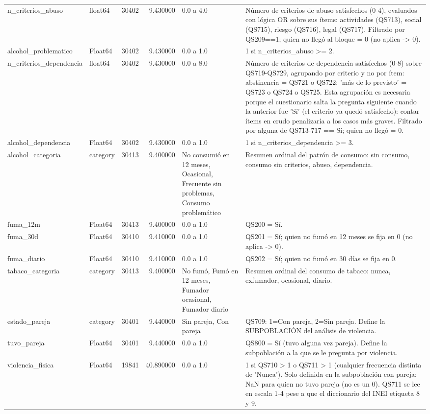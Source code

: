 \begin{longtable}{llrrll}
n\_criterios\_abuso & float64 & 30402 & 9.430000 & 0.0 a 4.0 & Número de criterios de abuso satisfechos (0-4), evaluados con lógica OR sobre sus ítems: actividades (QS713), social (QS715), riesgo (QS716), legal (QS717). Filtrado por QS209==1; quien no llegó al bloque = 0 (no aplica -> 0). \\
alcohol\_problematico & Float64 & 30402 & 9.430000 & 0.0 a 1.0 & 1 si n\_criterios\_abuso >= 2. \\
n\_criterios\_dependencia & float64 & 30402 & 9.430000 & 0.0 a 8.0 & Número de criterios de dependencia satisfechos (0-8) sobre QS719-QS729, agrupando por criterio y no por ítem: abstinencia = QS721 o QS722; 'más de lo previsto' = QS723 o QS724 o QS725. Esta agrupación es necesaria porque el cuestionario salta la pregunta siguiente cuando la anterior fue 'Sí' (el criterio ya quedó satisfecho): contar ítems en crudo penalizaría a los casos más graves. Filtrado por alguna de QS713-717 == Sí; quien no llegó = 0. \\
alcohol\_dependencia & Float64 & 30402 & 9.430000 & 0.0 a 1.0 & 1 si n\_criterios\_dependencia >= 3. \\
alcohol\_categoria & category & 30413 & 9.400000 & No consumió en 12 meses, Ocasional, Frecuente sin problemas, Consumo problemático & Resumen ordinal del patrón de consumo: sin consumo, consumo sin criterios, abuso, dependencia. \\
fuma\_12m & Float64 & 30413 & 9.400000 & 0.0 a 1.0 & QS200 = Sí. \\
fuma\_30d & Float64 & 30410 & 9.410000 & 0.0 a 1.0 & QS201 = Sí; quien no fumó en 12 meses se fija en 0 (no aplica -> 0). \\
fuma\_diario & Float64 & 30410 & 9.410000 & 0.0 a 1.0 & QS202 = Sí; quien no fumó en 30 días se fija en 0. \\
tabaco\_categoria & category & 30413 & 9.400000 & No fumó, Fumó en 12 meses, Fumador ocasional, Fumador diario & Resumen ordinal del consumo de tabaco: nunca, exfumador, ocasional, diario. \\
estado\_pareja & category & 30401 & 9.440000 & Sin pareja, Con pareja & QS709: 1=Con pareja, 2=Sin pareja. Define la SUBPOBLACIÓN del análisis de violencia. \\
tuvo\_pareja & Float64 & 30401 & 9.440000 & 0.0 a 1.0 & QS800 = Sí (tuvo alguna vez pareja). Define la subpoblación a la que se le pregunta por violencia. \\
violencia\_fisica & Float64 & 19841 & 40.890000 & 0.0 a 1.0 & 1 si QS710 > 1 o QS711 > 1 (cualquier frecuencia distinta de 'Nunca'). Solo definida en la subpoblación con pareja; NaN para quien no tuvo pareja (no es un 0). QS711 se lee en escala 1-4 pese a que el diccionario del INEI etiqueta 8 y 9. \\

\end{longtable}
